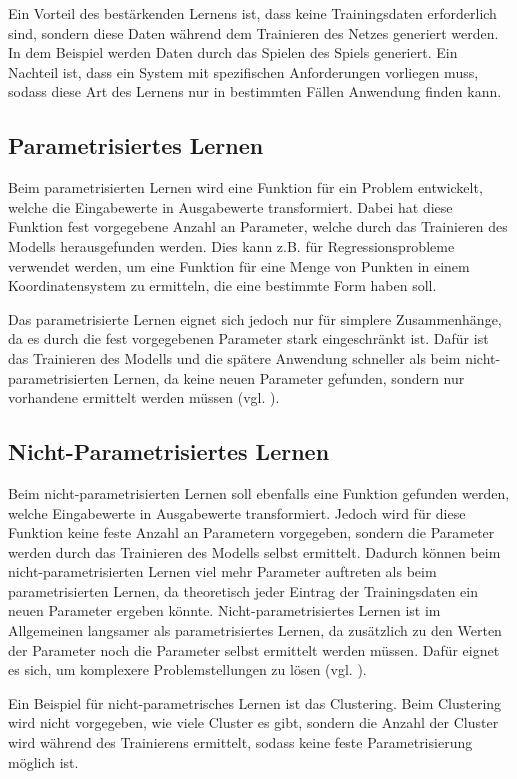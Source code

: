 Ein Vorteil des bestärkenden Lernens ist, dass keine Trainingsdaten erforderlich sind, sondern diese Daten während dem Trainieren des Netzes generiert werden. In dem Beispiel werden Daten durch das Spielen des Spiels generiert. Ein Nachteil ist, dass ein System mit spezifischen Anforderungen vorliegen muss, sodass diese Art des Lernens nur in bestimmten Fällen Anwendung finden kann.

\subsection{Parametrisiertes Lernen}
\label{parametrisiertesLernen}
Beim parametrisierten Lernen wird eine Funktion für ein Problem entwickelt, welche die Eingabewerte in Ausgabewerte transformiert. Dabei hat diese Funktion fest vorgegebene Anzahl an Parameter, welche durch das Trainieren des Modells herausgefunden werden. Dies kann z.B. für Regressionsprobleme verwendet werden, um eine Funktion für eine Menge von Punkten in einem Koordinatensystem zu ermitteln, die eine bestimmte Form haben soll.

Das parametrisierte Lernen eignet sich jedoch nur für simplere Zusammenhänge, da es durch die fest vorgegebenen Parameter stark eingeschränkt ist. Dafür ist das Trainieren des Modells und die spätere Anwendung schneller als beim nicht-parametrisierten Lernen, da keine neuen Parameter gefunden, sondern nur vorhandene ermittelt werden müssen (vgl. \cite[]{paraNichtPara}).

\subsection{Nicht-Parametrisiertes Lernen}
\label{nichtParametrisiertesLernen}
Beim nicht-parametrisierten Lernen soll ebenfalls eine Funktion gefunden werden, welche Eingabewerte in Ausgabewerte transformiert. Jedoch wird für diese Funktion keine feste Anzahl an Parametern vorgegeben, sondern die Parameter werden durch das Trainieren des Modells selbst ermittelt. Dadurch können beim nicht-parametrisierten Lernen viel mehr Parameter auftreten als beim parametrisierten Lernen, da theoretisch jeder Eintrag der Trainingsdaten ein neuen Parameter ergeben könnte. Nicht-parametrisiertes Lernen ist im Allgemeinen langsamer als parametrisiertes Lernen, da zusätzlich zu den Werten der Parameter noch die Parameter selbst ermittelt werden müssen. Dafür eignet es sich, um komplexere Problemstellungen zu lösen (vgl. \cite[]{paraNichtPara}).

Ein Beispiel für nicht-parametrisches Lernen ist das Clustering. Beim Clustering wird nicht vorgegeben, wie viele Cluster es gibt, sondern die Anzahl der Cluster wird während des Trainierens ermittelt, sodass keine feste Parametrisierung möglich ist.

